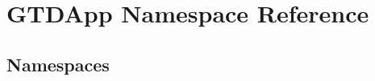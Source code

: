 \section{G\+T\+D\+App Namespace Reference}
\label{namespace_g_t_d_app}
\subsection*{Namespaces}
\begin{DoxyCompactItemize}
\end{DoxyCompactItemize}
